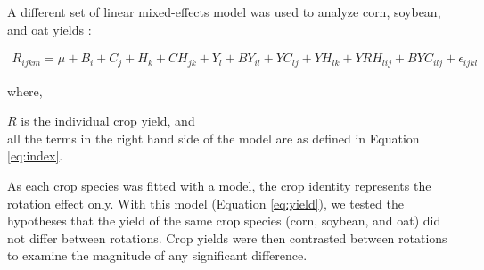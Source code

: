 \documentclass[
]{article}
\begin{document}
A different set of linear mixed-effects model was used to analyze corn, soybean, and oat yields \citep[\texttt{lme4} version 1.1-27.1,][]{batesLme4LinearMixedEffects2021}:

\begin{align}
R_{ijkm} = \mu + B_i + C_j + H_k + CH_{jk} + Y_l + BY_{il} + YC_{lj} + YH_{lk}  + YRH_{lij} + BYC_{ilj} + \epsilon_{ijkl}
\label{eq:yield}
\end{align}

where,

\(R\) is the individual crop yield, and\\
all the terms in the right hand side of the model are as defined in Equation \eqref{eq:index}.

As each crop species was fitted with a model, the crop identity represents the rotation effect only. With this model (Equation \eqref{eq:yield}), we tested the hypotheses that the yield of the same crop species (corn, soybean, and oat) did not differ between rotations. Crop yields were then contrasted between rotations to examine the magnitude of any significant difference.

  
\end{document}
